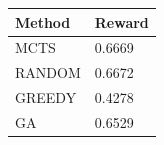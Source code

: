 \begin{tabular}{ll}
\hline
Method & Reward \\
\hline
  MCTS & 0.6669 \\
  RANDOM & 0.6672 \\
  GREEDY & 0.4278 \\
  GA & 0.6529 \\
\hline
\end{tabular}

